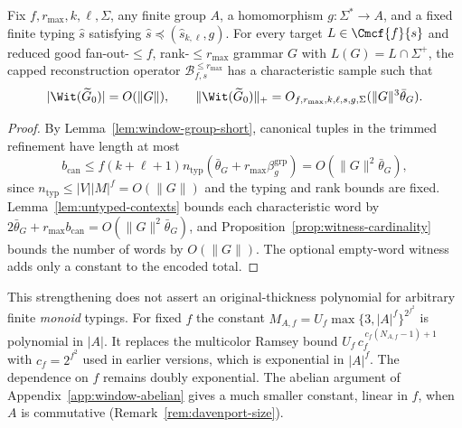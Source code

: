 \begin{theorem}
\label{thm:window-group-polydata}
Fix $f,r_{\max},k,\ell,\Sigma$, any finite group
$A$, a homomorphism $g:\Sigma^*\to A$, and a
fixed finite typing $\widehat{s}$ satisfying
$\widehat{s}\preceq(\widehat{s}_{k,\ell},g)$.
For every target $L\in\Cmcf{f}{s}$ and reduced good
fan-out-$\le f$, rank-$\le r_{\max}$ grammar $G$ with
$L(G)=L\cap\Sigma^+$, the capped reconstruction operator
$\mathcal B^{\le r_{\max}}_{f,s}$ has a characteristic
sample such that
\[
 |\Wit(\widetilde G_0)|=O(\|G\|),\qquad
 \|\Wit(\widetilde G_0)\|_+
 =O_{f,r_{\max},k,\ell,s,g,\Sigma}
   (\|G\|^3\bar\theta_G).
\]
\end{theorem}
\begin{proof}
By Lemma~\ref{lem:window-group-short},
canonical tuples in the trimmed refinement have
length at most
\[
 b_{\mathrm{can}}
 \le f(k+\ell+1)n_{\mathrm{typ}}
 (\bar\theta_G+r_{\max}\beta_g^{\mathrm{grp}})
 =O(\|G\|^2\bar\theta_G),
\]
since $n_{\mathrm{typ}}\le|V||M|^f=O(\|G\|)$
and the typing and rank bounds are fixed.
Lemma~\ref{lem:untyped-contexts} bounds each
characteristic word by
$2\bar\theta_G+r_{\max}b_{\mathrm{can}}
=O(\|G\|^2\bar\theta_G)$, and
Proposition~\ref{prop:witness-cardinality}
bounds the number of words by $O(\|G\|)$.
The optional empty-word witness adds only a
constant to the encoded total.
\end{proof}

\begin{remark}
This strengthening does not assert an original-thickness
polynomial for arbitrary finite \emph{monoid} typings.
For fixed $f$ the constant
$M_{A,f}=U_f\max\{3,|A|^f\}^{2^{f^2}}$ is polynomial in
$|A|$.  It replaces the multicolor Ramsey bound
$U_f\,c_f^{\,c_f(N_{A,f}-1)+1}$ with $c_f=2^{f^2}$ used in
earlier versions, which is exponential in $|A|^f$.  The
dependence on $f$ remains doubly exponential.  The abelian
argument of Appendix~\ref{app:window-abelian} gives a much
smaller constant, linear in $f$, when $A$ is commutative
(Remark~\ref{rem:davenport-size}).
\end{remark}
